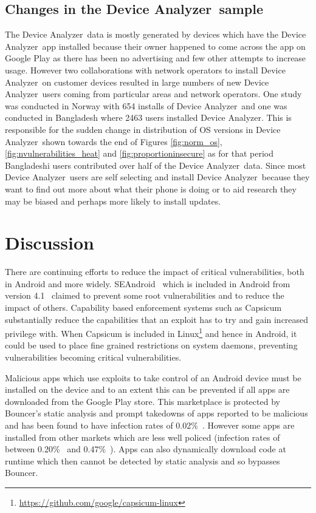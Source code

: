 \documentclass[conference,a4paper,twoside]{IEEEtran}
\newcommand{\da}{Device Analyzer}
\begin{document}
\subsection{Changes in the \da\ sample}
The \da\ data is mostly generated by devices which have the \da\ app installed because their owner happened to come across the app on Google Play as there has been no advertising and few other attempts to increase usage.
However two collaborations with network operators to install \da\ on customer devices resulted in large numbers of new \da\ users coming from particular areas and network operators.
One study was conducted in Norway with 654 installs of \da\ and one was conducted in Bangladesh where 2463 users installed \da.
This is responsible for the sudden change in distribution of OS versions in \da\ shown towards the end of Figures \ref{fig:norm_os}, \ref{fig:nvulnerabilities_heat} and \ref{fig:proportioninsecure} as for that period Bangladeshi users contributed over half of the \da\ data.
Since most \da\ users are self selecting and install \da\ because they want to find out more about what their phone is doing or to aid research they may be biased and perhaps more likely to install updates.


\section{Discussion}
There are continuing efforts to reduce the impact of critical vulnerabilities, both in Android and more widely.
SEAndroid~\cite{Smalley2013} which is included in Android from version 4.1~\cite{jelly-bean-release} claimed to prevent some root vulnerabilities and to reduce the impact of others.
Capability based enforcement systems such as Capsicum~\cite{Watson2010} substantially reduce the capabilities that an exploit has to try and gain increased privilege with.
When Capsicum is included in Linux\footnote{\url{https://github.com/google/capsicum-linux}} and hence in Android, it could be used to place fine grained restrictions on system daemons, preventing vulnerabilities becoming critical vulnerabilities.

Malicious apps which use exploits to take control of an Android device must be installed on the device and to an extent this can be prevented if all apps are downloaded from the Google Play store.
This marketplace is protected by Bouncer's static analysis and prompt takedowns of apps reported to be malicious and has been found to have infection rates of 0.02\%~\cite{Zhou2012a}.
However some apps are installed from other markets which are less well policed (infection rates of between 0.20\%~ and 0.47\%~\cite{Zhou2012a}).
Apps can also dynamically download code at runtime which then cannot be detected by static analysis and so bypasses Bouncer.
\end{document}
